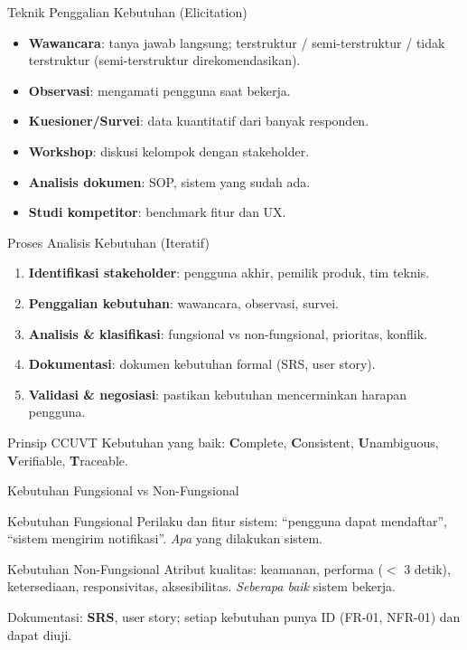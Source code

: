 \documentclass[handout]{beamer}
\begin{document}
\begin{frame}{Teknik Penggalian Kebutuhan (Elicitation)}
	\begin{itemize}
		\item \textbf{Wawancara}: tanya jawab langsung; terstruktur / semi-terstruktur / tidak terstruktur (semi-terstruktur direkomendasikan).
		\item \textbf{Observasi}: mengamati pengguna saat bekerja.
		\item \textbf{Kuesioner/Survei}: data kuantitatif dari banyak responden.
		\item \textbf{Workshop}: diskusi kelompok dengan stakeholder.
		\item \textbf{Analisis dokumen}: SOP, sistem yang sudah ada.
		\item \textbf{Studi kompetitor}: benchmark fitur dan UX.
	\end{itemize}
\end{frame}

\begin{frame}{Proses Analisis Kebutuhan (Iteratif)}
	\begin{enumerate}
		\item \textbf{Identifikasi stakeholder}: pengguna akhir, pemilik produk, tim teknis.
		\item \textbf{Penggalian kebutuhan}: wawancara, observasi, survei.
		\item \textbf{Analisis \& klasifikasi}: fungsional vs non-fungsional, prioritas, konflik.
		\item \textbf{Dokumentasi}: dokumen kebutuhan formal (SRS, user story).
		\item \textbf{Validasi \& negosiasi}: pastikan kebutuhan mencerminkan harapan pengguna.
	\end{enumerate}
	\begin{block}{Prinsip CCUVT}
		Kebutuhan yang baik: \textbf{C}omplete, \textbf{C}onsistent, \textbf{U}nambiguous, \textbf{V}erifiable, \textbf{T}raceable.
	\end{block}
\end{frame}

\begin{frame}{Kebutuhan Fungsional vs Non-Fungsional}
	\begin{block}{Kebutuhan Fungsional}
		Perilaku dan fitur sistem: ``pengguna dapat mendaftar'', ``sistem mengirim notifikasi''. \textit{Apa} yang dilakukan sistem.
	\end{block}
	\begin{block}{Kebutuhan Non-Fungsional}
		Atribut kualitas: keamanan, performa ($<$ 3 detik), ketersediaan, responsivitas, aksesibilitas. \textit{Seberapa baik} sistem bekerja.
	\end{block}
	Dokumentasi: \textbf{SRS}, user story; setiap kebutuhan punya ID (FR-01, NFR-01) dan dapat diuji.
\end{frame}
\end{document}
